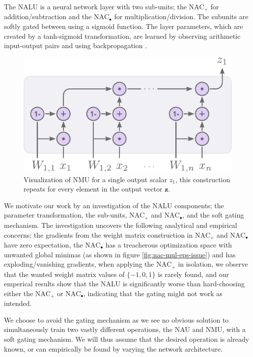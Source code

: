The NALU is a neural network layer with two sub-units; the $\text{NAC}_{+}$ for addition/subtraction and the $\text{NAC}_{\bullet}$ for multiplication/division.
The subunits are softly gated between using a sigmoid function. The layer parameters, which are created by a tanh-sigmoid transformation, are learned by observing arithmetic input-output pairs and using backpropagation \cite{rumelhart1986learning}.
\begin{figure}[h]
\centering
\includegraphics[scale=0.6]{graphics/nmu.pdf}
\caption{Visualization of NMU for a single output scalar $z_1$, this construction repeats for every element in the output vector $\mathbf{z}$.}
\end{figure}
We motivate our work by an investigation of the NALU components; the parameter transformation, the sub-units, $\text{NAC}_{+}$ and $\text{NAC}_{\bullet}$, and the soft gating mechanism.
The investigation uncovers the following analytical and empirical concerns; the gradients from the weight matrix construction in $\text{NAC}_{+}$ and $\text{NAC}_{\bullet}$ have zero expectation, the $\text{NAC}_{\bullet}$ has a treacherous optimization space with unwanted global minimas (as shown in figure \ref{fig:nac-mul-eps-issue}) and has exploding/vanishing gradients, when applying the $\text{NAC}_{+}$ in isolation, we observe that the wanted weight matrix values of $\{-1, 0, 1\}$ is rarely found, and our emperical results show that the NALU is significantly worse than hard-choosing either the $\text{NAC}_{+}$ or $\text{NAC}_{\bullet}$, indicating that the gating might not work as intended.

We choose to avoid the gating mechanism as we see no obvious solution to simultaneously train two vastly different operations, the NAU and NMU, with a soft gating mechanism.
We will thus assume that the desired operation is already known, or can empirically be found by varying the network architecture.


